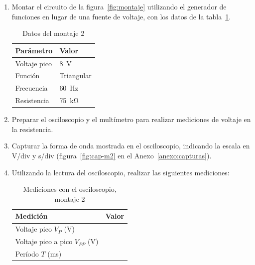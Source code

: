 \documentclass{article}
\newcommand{\vacio}[1][2cm]{\underline{\hspace{#1}}}
\begin{document}
    \begin{enumerate}
        \item Montar el circuito de la figura~\ref{fig:montaje} utilizando el generador de funciones en lugar de una fuente de voltaje, con los datos de la tabla~\ref{tab:m2}.

        \begin{table}[ht!]
            \centering
            \begin{tabular}{ll}
                \toprule
                Parámetro      & Valor                      \\
                \midrule
                Voltaje pico   & \SI{8}{\volt}              \\
                Función        & Triangular                 \\
                Frecuencia     & \SI{60}{\hertz}            \\
                Resistencia    & \SI{75}{\kilo\ohm}         \\
                \bottomrule
            \end{tabular}
            \caption{Datos del montaje 2}\label{tab:m2}
        \end{table}

        \item Preparar el osciloscopio y el multímetro para realizar mediciones de voltaje en la resistencia.

        \item Capturar la forma de onda mostrada en el osciloscopio, indicando la escala en V/div y s/div (figura~\ref{fig:cap-m2} en el Anexo~\ref{anexo:capturas}).

        \item Utilizando la lectura del osciloscopio, realizar las siguientes mediciones:

        \begin{table}[ht!]
            \centering
            \begin{tabular}{lc}
                \toprule
                Medición                         & Valor  \\
                \midrule
                Voltaje pico $V_P$ (V)           & \vacio \\
                Voltaje pico a pico $V_{PP}$ (V) & \vacio \\
                Período $T$ (ms)                 & \vacio \\
                \bottomrule
            \end{tabular}
            \caption{Mediciones con el osciloscopio, montaje 2}\label{tab:osc-m2}
        \end{table}


\end{enumerate}
\end{document}

